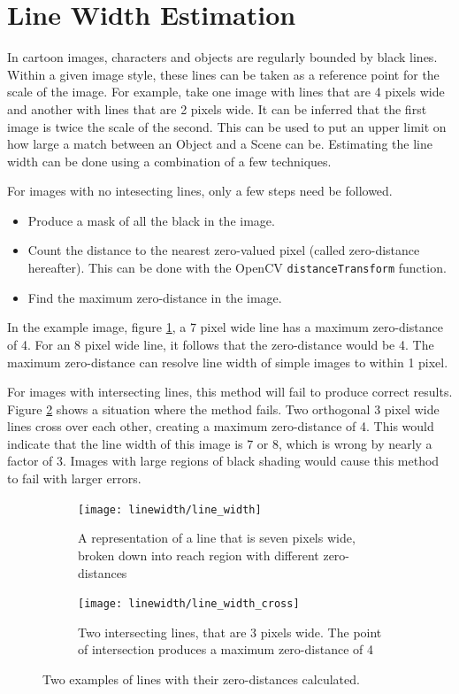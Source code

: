 \documentclass[../main.tex]{subfiles}
\begin{document}
  \section{Line Width Estimation}
  In cartoon images, characters and objects are regularly bounded by black lines.
  Within a given image style, these lines can be taken as a reference point for the scale of the image.
  For example, take one image with lines that are 4 pixels wide and another with lines that are 2 pixels wide.
  It can be inferred that the first image is twice the scale of the second.
  This can be used to put an upper limit on how large a match between an Object and a Scene can be.
  Estimating the line width can be done using a combination of a few techniques.

  For images with no intesecting lines, only a few steps need be followed.
  \begin{itemize}
    \item Produce a mask of all the black in the image.
    \item Count the distance to the nearest zero-valued pixel (called zero-distance hereafter). This can be done with the OpenCV \texttt{distanceTransform} function. %
    \item Find the maximum zero-distance in the image.
  \end{itemize}
  In the example image, figure \ref{lineseven}, a 7 pixel wide line has a maximum zero-distance of 4.
  For an 8 pixel wide line, it follows that the zero-distance would be 4.
  The maximum zero-distance can resolve line width of simple images to within 1 pixel.

  For images with intersecting lines, this method will fail to produce correct results.
  Figure \ref{linecross} shows a situation where the method fails.
  Two orthogonal 3 pixel wide lines cross over each other, creating a maximum zero-distance of 4.
  This would indicate that the line width of this image is 7 or 8, which is wrong by nearly a factor of 3.
  Images with large regions of black shading would cause this method to fail with larger errors.

  \begin{figure}[h]
    \centering
    \begin{subfigure}[B]{0.9\textwidth}
      \centering
      \texttt{[image: linewidth/line\_width]}
      \caption{A representation of a line that is seven pixels wide, broken down into reach region with different zero-distances}
      \label{lineseven}
    \end{subfigure}

    \begin{subfigure}[B]{0.9\textwidth}
      \centering
      \texttt{[image: linewidth/line\_width\_cross]}
      \caption{Two intersecting lines, that are 3 pixels wide. The point of intersection produces a maximum zero-distance of 4}
      \label{linecross}
    \end{subfigure}
    \caption[
      Examples of the zero-distance of black lines  
    ]{
      Two examples of lines with their zero-distances calculated.
    }
    \label{linewidthexamples}
  \end{figure}
\end{document}
